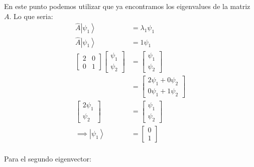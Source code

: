 \documentclass{report}
\begin{document}
En este punto podemos utilizar que ya encontramos los eigenvalues de la matriz $A$. Lo que seria:
\begin{align*}
	\hat{A}\left| \psi_1 \right> &= \lambda_1 \psi_1\\
	\hat{A}\left| \psi_1 \right> &= 1 \psi_1\\
	\begin{bmatrix}
		2 & 0 \\
		0 & 1
	\end{bmatrix}
	\begin{bmatrix}
		\psi_1 \\
		\psi_2
	\end{bmatrix}
	&= \begin{bmatrix}
		\psi_1 \\
		\psi_2
	\end{bmatrix}\\
	&= \begin{bmatrix}
		2 \psi_1 + 0 \psi_2 \\
		0 \psi_1 + 1 \psi_2 
	\end{bmatrix}\\
	\begin{bmatrix}
		2 \psi_1 \\
		\psi_2 
	\end{bmatrix} &= \begin{bmatrix}
		\psi_1 \\
		\psi_2
	\end{bmatrix}\\
	\implies \left| \psi_1 \right> &= \begin{bmatrix} 0 \\ 1 \end{bmatrix}\\
\end{align*}

Para el segundo eigenvector:
\end{document}
